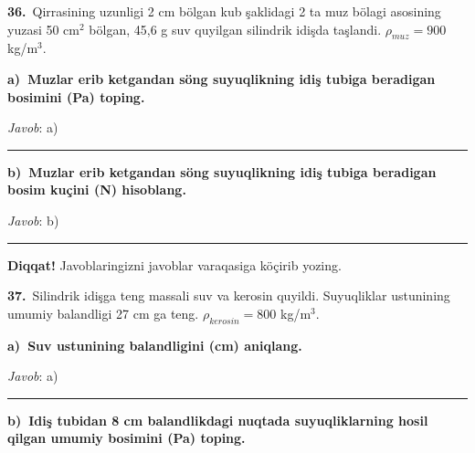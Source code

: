 \documentclass[11pt,a4paper]{article}
\newcommand{\blank}{\rule{5cm}{0.4pt}}
\begin{document}
\noindent{}\par\vspace{14pt}
\noindent\textbf{36.}\ Qirrasining uzunligi 2 cm bölgan kub şaklidagi 2 ta muz bölagi asosining yuzasi 50 cm$^2$ bölgan, 45,6 g suv quyilgan silindrik idişda taşlandi. $\rho_{muz}=900$ kg/m$^3$.\par\smallskip
\medskip\noindent\textbf{a)\ Muzlar erib ketgandan söng suyuqlikning idiş tubiga beradigan bosimini (Pa) toping.}\par
\noindent\textit{Javob}: a)\ \blank\par
\medskip\noindent\textbf{b)\ Muzlar erib ketgandan söng suyuqlikning idiş tubiga beradigan bosim kuçini (N) hisoblang.}\par
\noindent\textit{Javob}: b)\ \blank\par
\medskip\noindent\textbf{Diqqat!} Javoblaringizni javoblar varaqasiga köçirib yozing.\par\vspace{10pt}
\noindent\textbf{37.}\ Silindrik idişga teng massali suv va kerosin quyildi. Suyuqliklar ustunining umumiy balandligi 27 cm ga teng. $\rho_{kerosin}=800$ kg/m$^3$.\par\smallskip
\medskip\noindent\textbf{a)\ Suv ustunining balandligini (cm) aniqlang.}\par
\noindent\textit{Javob}: a)\ \blank\par
\medskip\noindent\textbf{b)\ Idiş tubidan 8 cm balandlikdagi nuqtada suyuqliklarning hosil qilgan umumiy bosimini (Pa) toping.}\par
\end{document}
